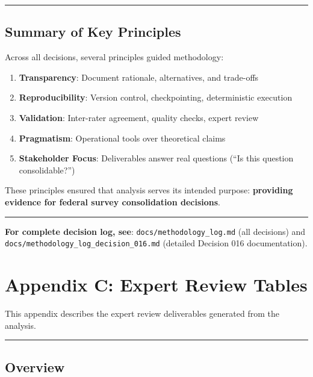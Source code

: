 \documentclass[
  letterpaper,
]{report}
\providecommand{\tightlist}{%
  \setlength{\itemsep}{0pt}\setlength{\parskip}{0pt}}
\begin{document}
\begin{center}\rule{0.5\linewidth}{0.5pt}\end{center}

\section{Summary of Key Principles}\label{summary-of-key-principles}

Across all decisions, several principles guided methodology:

\begin{enumerate}
\def\labelenumi{\arabic{enumi}.}
\tightlist
\item
  \textbf{Transparency}: Document rationale, alternatives, and
  trade-offs
\item
  \textbf{Reproducibility}: Version control, checkpointing,
  deterministic execution
\item
  \textbf{Validation}: Inter-rater agreement, quality checks, expert
  review
\item
  \textbf{Pragmatism}: Operational tools over theoretical claims
\item
  \textbf{Stakeholder Focus}: Deliverables answer real questions (``Is
  this question consolidable?'')
\end{enumerate}

These principles ensured that analysis serves its intended purpose:
\textbf{providing evidence for federal survey consolidation decisions}.

\begin{center}\rule{0.5\linewidth}{0.5pt}\end{center}

\textbf{For complete decision log, see}:
\texttt{docs/methodology\_log.md} (all decisions) and
\texttt{docs/methodology\_log\_decision\_016.md} (detailed Decision 016
documentation).

\chapter{Appendix C: Expert Review
Tables}\label{appendix-c-expert-review-tables}

This appendix describes the expert review deliverables generated from
the analysis.

\begin{center}\rule{0.5\linewidth}{0.5pt}\end{center}

\section{Overview}\label{overview-1}
\end{document}
